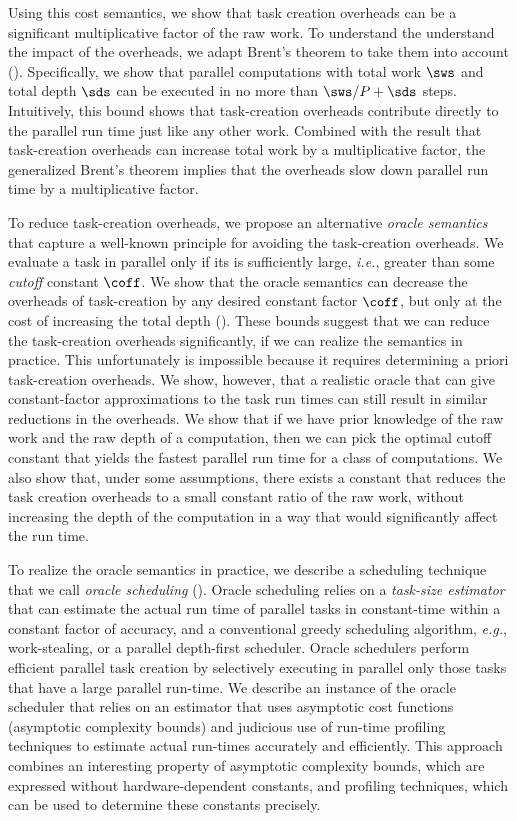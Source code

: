 Using this cost semantics, we show that task creation overheads can be
a significant multiplicative factor of the raw work.  To understand
the understand the impact of the overheads, we adapt Brent's theorem
to take them into account ().  Specifically, we
show that parallel computations with total work $\sws$ and total
depth $\sds$ can be executed in no more than $\sws/P + \sds$ steps.
Intuitively, this bound shows that task-creation overheads contribute
directly to the parallel run time just like any other work.  Combined
with the result that task-creation overheads can increase total work
by a multiplicative factor, the generalized Brent's theorem implies
that the overheads slow down parallel run time by a multiplicative
factor.

To reduce task-creation overheads, we propose an alternative {\em
  oracle semantics} that capture a well-known principle for avoiding
the task-creation overheads. We evaluate a task in parallel only if
its is sufficiently large, \textit{i.e.}, greater than some {\em
  cutoff} constant $\coff$.  We show that the oracle semantics can
decrease the overheads of task-creation by any desired constant
factor $\coff$, but only at the cost of increasing the total depth
().
%
These bounds suggest that we can reduce the
task-creation overheads significantly, if we can realize the semantics
in practice.  This  unfortunately is impossible because it requires
determining a priori task-creation overheads.  We show, however, that
a realistic oracle that can give constant-factor approximations to the
task run times can still result in similar reductions in the
overheads. We show that if we have prior knowledge of the
raw work and the raw depth of a computation, then we can pick the
optimal cutoff constant \coff that yields the fastest parallel run
time for a class of computations.  We also show that, under some
assumptions, there exists a constant \coff that reduces the task
creation overheads to a small constant ratio of the raw work, without
increasing the depth of the computation in a way that would 
significantly affect the run time. %


To realize the oracle semantics in practice, we describe a scheduling
technique that we call {\em oracle scheduling} ().
Oracle scheduling relies on a {\em task-size estimator} that can
estimate the actual run time of parallel tasks in constant-time within
a constant factor of accuracy, and a conventional greedy scheduling
algorithm, \textit{e.g.}, work-stealing, or a parallel depth-first
scheduler.  Oracle schedulers perform efficient parallel task creation
by selectively executing in parallel only those tasks that have a
large parallel run-time. We describe an instance of the oracle
scheduler that relies on an estimator that uses asymptotic cost
functions (asymptotic complexity bounds) and judicious use of run-time
profiling techniques to estimate actual run-times accurately and
efficiently.  This approach combines an interesting property of
asymptotic complexity bounds, which are expressed without
hardware-dependent constants, and profiling techniques, which can be
used to determine these constants precisely.

